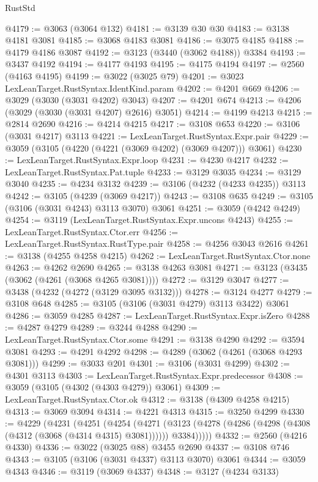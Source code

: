 \begin{lexlean}{RustStd}
\begin{coremodule}
@4179 := @3063 (@3064 @132)
@4181 := @3139 @30 @30
@4183 := @3138 @4181 @3081
@4185 := @3068 @4183 @3081
@4186 := @3075 @4185
@4188 := @4179 @4186 @3087
@4192 := @3123 (@3440 (@3062 @4188)) @3384
@4193 := @3437 @4192
@4194 := @4177 @4193
@4195 := @4175 @4194
@4197 := @2560 (@4163 @4195)
@4199 := @3022 (@3025 @79)
@4201 := @3023 LexLeanTarget.RustSyntax.IdentKind.param
@4202 := @4201 @669
@4206 := @3029 (@3030 (@3031 @4202) @3043)
@4207 := @4201 @674
@4213 := @4206 (@3029 (@3030 (@3031 @4207) @2616) @3051)
@4214 := @4199 @4213
@4215 := @2814 @2690
@4216 := @4214 @4215
@4217 := @3108 @653
@4220 := @3106 (@3031 @4217) @3113
@4221 := LexLeanTarget.RustSyntax.Expr.pair
@4229 := @3059 (@3105 (@4220 (@4221 (@3069 @4202) (@3069 @4207))) @3061)
@4230 := LexLeanTarget.RustSyntax.Expr.loop
@4231 := @4230 @4217
@4232 := LexLeanTarget.RustSyntax.Pat.tuple
@4233 := @3129 @3035
@4234 := @3129 @3040
@4235 := @4234 @3132
@4239 := @3106 (@4232 (@4233 @4235)) @3113
@4242 := @3105 (@4239 (@3069 @4217))
@4243 := @3108 @635
@4249 := @3105 (@3106 (@3031 @4243) @3113 @3070) @3061
@4251 := @3059 (@4242 @4249)
@4254 := @3119 (LexLeanTarget.RustSyntax.Expr.uncons @4243)
@4255 := LexLeanTarget.RustSyntax.Ctor.err
@4256 := LexLeanTarget.RustSyntax.RustType.pair
@4258 := @4256 @3043 @2616
@4261 := @3138 (@4255 @4258 @4215)
@4262 := LexLeanTarget.RustSyntax.Ctor.none
@4263 := @4262 @2690
@4265 := @3138 @4263 @3081
@4271 := @3123 (@3435 (@3062 (@4261 (@3068 @4265 @3081))))
@4272 := @3129 @3047
@4277 := @3438 (@4232 (@4272 (@3129 @3095 @3132)))
@4278 := @3124 @4277
@4279 := @3108 @648
@4285 := @3105 (@3106 (@3031 @4279) @3113 @3422) @3061
@4286 := @3059 @4285
@4287 := LexLeanTarget.RustSyntax.Expr.isZero
@4288 := @4287 @4279
@4289 := @3244 @4288
@4290 := LexLeanTarget.RustSyntax.Ctor.some
@4291 := @3138 @4290
@4292 := @3594 @3081
@4293 := @4291 @4292
@4298 := @4289 (@3062 (@4261 (@3068 @4293 @3081)))
@4299 := @3033 @201
@4301 := @3106 (@3031 @4299)
@4302 := @4301 @3113
@4303 := LexLeanTarget.RustSyntax.Expr.predecessor
@4308 := @3059 (@3105 (@4302 (@4303 @4279)) @3061)
@4309 := LexLeanTarget.RustSyntax.Ctor.ok
@4312 := @3138 (@4309 @4258 @4215)
@4313 := @3069 @3094
@4314 := @4221 @4313
@4315 := @3250 @4299
@4330 := @4229
    (@4231
      (@4251
        (@4254
          (@4271
            (@3123 (@4278 (@4286 (@4298 (@4308 (@4312 (@3068 (@4314 @4315) @3081)))))) @3384)))))
@4332 := @2560 (@4216 @4330)
@4336 := @3022 (@3025 @88) @3455 @2690
@4337 := @3108 @746
@4343 := @3105 (@3106 (@3031 @4337) @3113 @3070) @3061
@4344 := @3059 @4343
@4346 := @3119 (@3069 @4337)
@4348 := @3127 (@4234 @3133)

\end{coremodule}
\end{lexlean}
